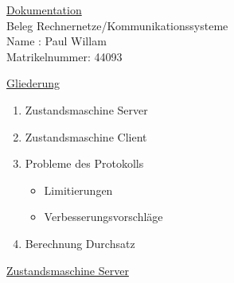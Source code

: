 \documentclass[12pt]{article}
\begin{document}
\begin{center}
\vspace*{30mm}
{\Huge \underline  {Dokumentation}} \\ 
\vspace{10mm}
{\Large Beleg Rechnernetze/Kommunikationssysteme} \\
{\Large Name : Paul Willam} \\
{\Large Matrikelnummer: 44093 } \\

\end{center}
\pagebreak

\begin{center}
{\Huge \underline {Gliederung}} \\
\par
\vspace*{20mm}
\begin{enumerate}
  \item {\Large Zustandsmaschine Server} \\
  \par
  \item {\Large Zustandsmaschine Client} \\
  \par
  \item {\Large Probleme des Protokolls} \\
  \par
    \begin{itemize}
        \item {\Large Limitierungen } \\
        \par
        \item {\Large Verbesserungsvorschläge} \\
        \par
    \end{itemize} 
  \item {\Large Berechnung Durchsatz} \\
  \par
\end{enumerate}
\end{center}
\pagebreak


\begin{center}
{\Huge \underline {Zustandsmaschine Server}}
\end{center}
\par

\vspace*{\fill}
\end{document}

